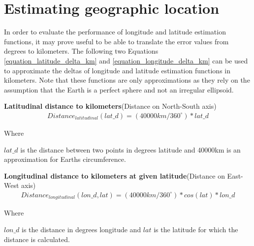 \chapter{Estimating geographic location}
\label{chapter_est_geoloc}
In order to evaluate the performance of longitude and latitude estimation functions, it may prove useful to be able to translate the error values from degrees to kilometers. The following two Equations \ref{equation_latitude_delta_km} and \ref{equation_longitude_delta_km} can be used to approximate the deltas of longitude and latitude estimation functions in kilometers. Note that these functions are only approximations as they rely on the assumption that the Earth is a perfect sphere and not an irregular ellipsoid.


\hfill \break
\noindent\textbf{Latitudinal distance to kilometers}(Distance on North-South axis)
%
\begin{equation}
\begin{split}
\label{equation_latitude_delta_km}
Distance_{latitudinal}(lat\_d)=(40 000km/360^\circ)* lat\_d
\end{split}
\end{equation}

\noindent Where 

$lat\_d$ is the distance between two points in degrees latitude and 40000km is an approximation for Earths circumference.

\vspace{5mm} %

\noindent\textbf{Longitudinal distance to kilometers at given latitude}(Distance on East-West axis)
%
\begin{equation}
\begin{split}
\label{equation_longitude_delta_km}
Distance_{longitudinal}(lon\_d, lat)=(40 000km/360^\circ)* cos(lat)*lon\_d
\end{split}
\end{equation}

\noindent Where 

$lon\_d$ is the distance in degrees longitude and $lat$ is the latitude for which the distance is calculated.



\vspace{5mm} %


